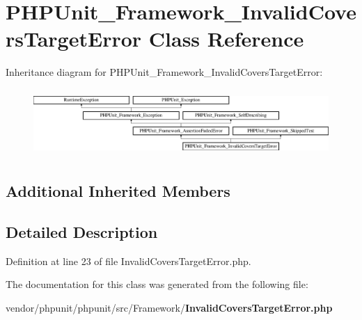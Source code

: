 \section{P\+H\+P\+Unit\+\_\+\+Framework\+\_\+\+Invalid\+Covers\+Target\+Error Class Reference}
\label{class_p_h_p_unit___framework___invalid_covers_target_error}
Inheritance diagram for P\+H\+P\+Unit\+\_\+\+Framework\+\_\+\+Invalid\+Covers\+Target\+Error\+:\begin{figure}[H]
\begin{center}
\leavevmode
\includegraphics[height=2.601626cm]{class_p_h_p_unit___framework___invalid_covers_target_error}
\end{center}
\end{figure}
\subsection*{Additional Inherited Members}


\subsection{Detailed Description}


Definition at line 23 of file Invalid\+Covers\+Target\+Error.\+php.



The documentation for this class was generated from the following file\+:\begin{DoxyCompactItemize}
\item 
vendor/phpunit/phpunit/src/\+Framework/{\bf Invalid\+Covers\+Target\+Error.\+php}\end{DoxyCompactItemize}
